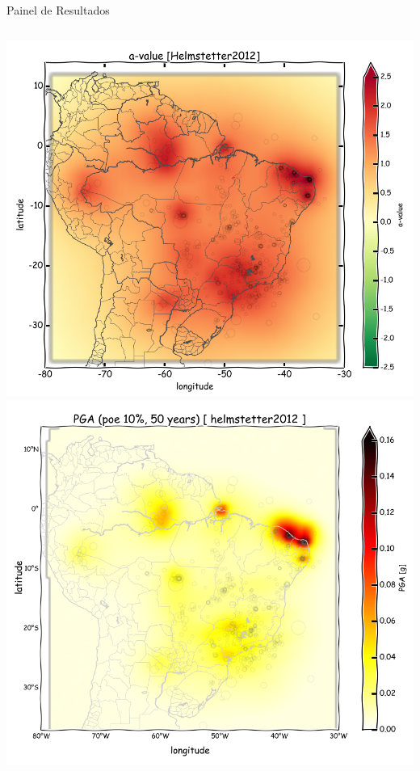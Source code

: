 \documentclass[ucs,8pt]{beamer}
\begin{document}
\begin{frame}{Painel de Resultados}
\begin{columns}
	\begin{column}[T]{.24\textwidth}
		\includegraphics[width=1\textwidth]{a_helmstetter} \\
		\includegraphics[width=1\textwidth]{pga_helmstetter}
	\end{column}
	
\end{columns}
\end{frame}
\end{document}
